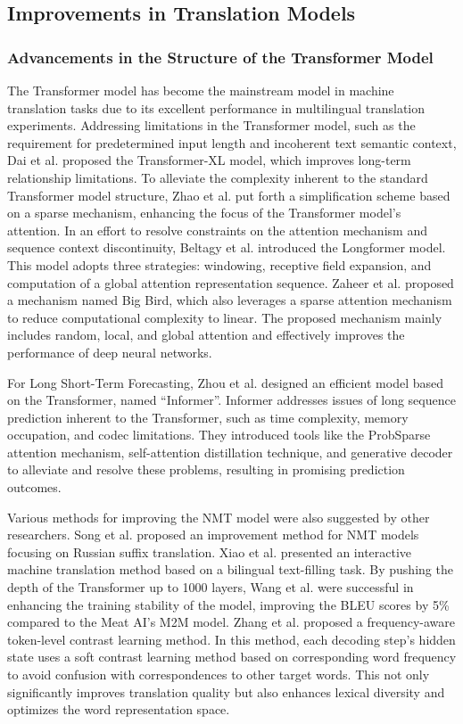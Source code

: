 \documentclass[acmsmall]{acmart}
\begin{document}
\subsection{Improvements in Translation Models}

\subsubsection{Advancements in the Structure of the Transformer Model}

The Transformer model has become the mainstream model in machine translation tasks due to its excellent performance in multilingual translation experiments. Addressing limitations in the Transformer model, such as the requirement for predetermined input length and incoherent text semantic context, Dai et al. \cite{n4-23} proposed the Transformer-XL model, which improves long-term relationship limitations. To alleviate the complexity inherent to the standard Transformer model structure, Zhao et al. \cite{n4-24} put forth a simplification scheme based on a sparse mechanism, enhancing the focus of the Transformer model's attention. In an effort to resolve constraints on the attention mechanism and sequence context discontinuity, Beltagy et al. \cite{n4-25} introduced the Longformer model. This model adopts three strategies: windowing, receptive field expansion, and computation of a global attention representation sequence. Zaheer et al. \cite{n4-26} proposed a mechanism named Big Bird, which also leverages a sparse attention mechanism to reduce computational complexity to linear. The proposed mechanism mainly includes random, local, and global attention and effectively improves the performance of deep neural networks. 

For Long Short-Term Forecasting, Zhou et al. \cite{n4-27} designed an efficient model based on the Transformer, named ``Informer''. Informer addresses issues of long sequence prediction inherent to the Transformer, such as time complexity, memory occupation, and codec limitations. They introduced tools like the ProbSparse attention mechanism, self-attention distillation technique, and generative decoder to alleviate and resolve these problems, resulting in promising prediction outcomes.

Various methods for improving the NMT model were also suggested by other researchers. Song et al. \cite{n4-28} proposed an improvement method for NMT models focusing on Russian suffix translation. Xiao et al. \cite{n4-29} presented an interactive machine translation method based on a bilingual text-filling task. By pushing the depth of the Transformer up to 1000 layers, Wang et al. \cite{n4-30} were successful in enhancing the training stability of the model, improving the BLEU scores by 5\% compared to the Meat AI's M2M model. Zhang et al\cite{n4-31}. proposed a frequency-aware token-level contrast learning method. In this method, each decoding step's hidden state uses a soft contrast learning method based on corresponding word frequency to avoid confusion with correspondences to other target words. This not only significantly improves translation quality but also enhances lexical diversity and optimizes the word representation space. 
\end{document}

